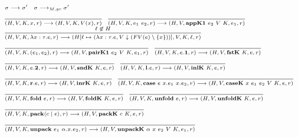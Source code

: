 \documentclass[fleqn]{article}
\begin{document}
\[
\scriptsize
\begin{array}{l}
	\sigma \longrightarrow \sigma' \hspace{1em} \sigma \longrightarrow_{M,gc} \sigma' \\
	\infer{(H,V,K,x,r) \longrightarrow (H,V,K,V(x),r)}{\vspace{1em}} \hspace{1em}
	\infer{(H,V,K,e_1~e_2,r) \longrightarrow (H,V,\mathbf{appK1}~e_2~V~K,e_1,r)}{\vspace{1em}} \\
	\infer{(H,V,K,\lambda x:\tau. e,r) \longrightarrow (H[\ell \mapsto (\lambda x : \tau. e, V \downarrow (FV(e) \setminus \{x\}))],V,K,\ell,r)}{\ell \not\in H} \\
	\infer{(H,V,K,(e_1,e_2),r) \longrightarrow (H,V,\mathbf{pairK1}~e_2~V~K,e_1,r)}{\vspace{1em}} \hspace{1em}
	\infer{(H,V,K,e.\mathbf{1},r) \longrightarrow (H,V,\mathbf{fstK}~K,e,r)}{\vspace{1em}} \\
	\infer{(H,V,K,e.\mathbf{2},r) \longrightarrow (H,V,\mathbf{sndK}~K,e,r)}{\vspace{1em}} \hspace{1em}
	\infer{(H,V,K,\mathbf{l}.e,r) \longrightarrow (H,V,\mathbf{inlK}~K,e,r)}{\vspace{1em}} \\
	\infer{(H,V,K,\mathbf{r}.e,r) \longrightarrow (H,V,\mathbf{inrK}~K,e,r)}{\vspace{1em}} \hspace{1em}
	\infer{(H,V,K,\mathbf{case}~e~x.e_1~x.e_2,r) \longrightarrow (H,V,\mathbf{caseK}~x~e_1~e_2~V~K,e,r)}{\vspace{1em}} \\
	\infer{(H,V,K,\mathbf{fold}~e,r) \longrightarrow (H,V,\mathbf{foldK}~K,e,r)}{\vspace{1em}} \hspace{1em}
	\infer{(H,V,K,\mathbf{unfold}~e,r) \longrightarrow (H,V,\mathbf{unfoldK}~K,e,r)}{\vspace{1em}} \\
	\infer{(H,V,K,\mathbf{pack} \langle c \mid e \rangle,r) \longrightarrow (H,V,\mathbf{packK}~c~K,e,r)}{\vspace{1em}} \\
	\infer{(H,V,K,\mathbf{unpack}~e_1~\alpha.x. e_2,r) \longrightarrow (H,V,\mathbf{unpackK}~\alpha~x~e_2~V~K,e_1,r)}{\vspace{1em}} \hspace{1em}

\end{array}\]
\end{document}
